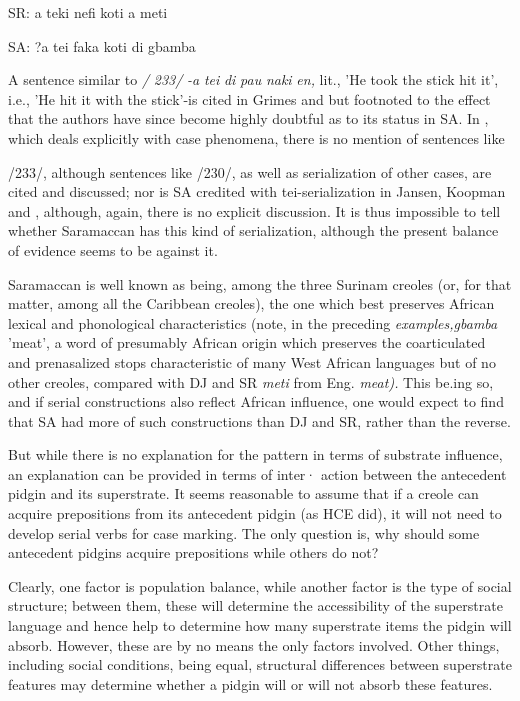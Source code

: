 \ea\label{ex:232}
 SR: a teki nefi koti a meti
\glt
\z

\ea\label{ex:233}
 SA: ?a tei faka koti di gbamba
\glt
\z

A sentence similar to \textit{/} \textit{233/} \textit{{}-}\textit{a} \textit{tei} \textit{di} \textit{pau} \textit{naki} \textit{en,} lit., 'He took the stick hit it', i.e., 'He hit it with the stick'{}-is cited in Grimes and \citet{Glock1970} but footnoted to the effect that the authors have since become highly doubtful as to its status in SA. In \citet{Glock1972}, which deals explicitly with case phenomena, there is no mention of sentences like

/233/, although sentences like /230/, as well as serialization of other cases, are cited and discussed; nor is SA credited with tei-serialization in Jansen, Koopman and \citet{Muysken1978}, although, again, there is no explicit discussion. It is thus impossible to tell whether Saramaccan has this kind of serialization, although the present balance of evidence seems to be against it.

Saramaccan is well known as being, among the three Surinam creoles (or, for that matter, among all the Caribbean creoles), the one which best preserves African lexical and phonological characteristics
(note, in the preceding \textit{examples,gbamba} 'meat', a word of presumably African origin which preserves the coarticulated and prenasalized stops characteristic of many West African languages but of no other creoles, compared with DJ and SR \textit{meti} from Eng. \textit{meat).} This be.ing so, and if serial constructions also reflect African influence, one would expect to find that SA had more of such constructions than DJ and SR, rather than the reverse.

But while there is no explanation for the pattern in terms of substrate influence, an explanation can be provided in terms of inter· action between the antecedent pidgin and its superstrate. It seems reasonable to assume that if a creole can acquire prepositions from its antecedent pidgin (as HCE did), it will not need to develop serial verbs for case marking. The only question is, why should some antecedent pidgins acquire prepositions while others do not?

Clearly, one factor is population balance, while another factor is the type of social structure; between them, these will determine the accessibility of the superstrate language and hence help to deter\-mine how many superstrate items the pidgin will absorb. However, these are by no means the only factors involved. Other things, including social conditions, being equal, structural differences between super\-strate features may determine whether a pidgin will or will not absorb these features.

